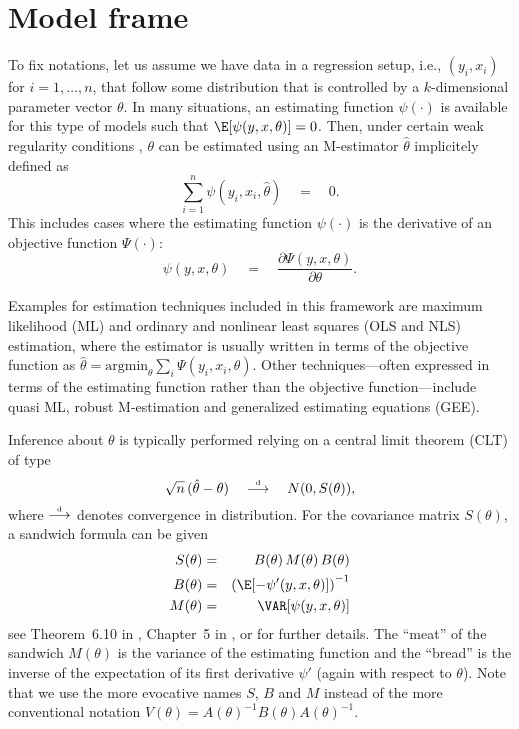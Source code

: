 \documentclass{Z}
\newcommand{\darrow}{\stackrel{\mbox{\tiny \textnormal{d}}}{\longrightarrow}}
\begin{document}
{
\section{Model frame} \label{sec:model}
\nopagebreak 

To fix notations, let us assume we have data in a regression setup, i.e., 
$(y_i, x_i)$ for $i = 1, \dots, n$, that follow some distribution that is 
controlled by a $k$-dimensional parameter vector $\theta$. In many situations,
an estimating function $\psi(\cdot)$ is available for this type of models
such that $\E[\psi(y, x, \theta)] = 0$. Then, under certain weak regularity
conditions \citep[see e.g.,][]{hac:White:1994}, 
$\theta$ can be estimated using an M-estimator $\hat \theta$ implicitely defined as
  \begin{equation} \label{eq:estfun}
    \sum_{i = 1}^n \psi(y_i, x_i, \hat \theta) \quad = \quad 0.
  \end{equation}
This includes cases where the estimating function $\psi(\cdot)$ is
the derivative of an objective function $\Psi(\cdot)$:
  \begin{equation} \label{eq:score}
    \psi(y, x, \theta) \quad = \quad \frac{\partial \Psi(y, x, \theta)}{\partial \theta}.
  \end{equation}
}

Examples for estimation techniques included in this framework are maximum likelihood (ML)
and ordinary and nonlinear least squares (OLS and NLS) estimation, where the estimator
is usually written in terms of the objective function as
$\hat \theta = \mbox{argmin}_\theta \sum_i \Psi(y_i, x_i, \theta)$.
Other techniques---often expressed in terms of the estimating function rather than
the objective function---include quasi ML, robust M-estimation and generalized estimating
equations (GEE). 

Inference about $\theta$ is typically performed relying on a central
limit theorem (CLT) of type
  \begin{equation} \label{eq:clt}
    \sqrt{n} \, (\hat \theta - \theta) \quad \darrow \quad N(0, S(\theta)),
  \end{equation}
where $\darrow$ denotes convergence in distribution. For the covariance matrix
$S(\theta)$, a sandwich formula can be given
\begin{eqnarray} \label{eq:sandwich}
  S(\theta) & = & B(\theta) \, M(\theta) \, B(\theta) \\  \label{eq:bread}
  B(\theta) & = & \left( \E[ - \psi'(y, x, \theta) ] \right)^{-1} \\  \label{obj}
  M(\theta) & = & \VAR[ \psi(y, x, \theta) ]
\end{eqnarray}
see Theorem~6.10 in \cite{hac:White:1994}, Chapter~5 in \cite{hac:Cameron+Trivedi:2005},
or \cite{hac:Stefanski+Boos:2002} for further details.
The ``meat'' of the sandwich $M(\theta)$ is the variance of the estimating
function and the ``bread'' is the inverse of the expectation of its first derivative $\psi'$
(again with respect to $\theta$). Note that we use the more evocative names $S$,
$B$ and $M$ instead of the more conventional notation $V(\theta) = A(\theta)^{-1} B(\theta)
A(\theta)^{-1}$.
\end{document}
